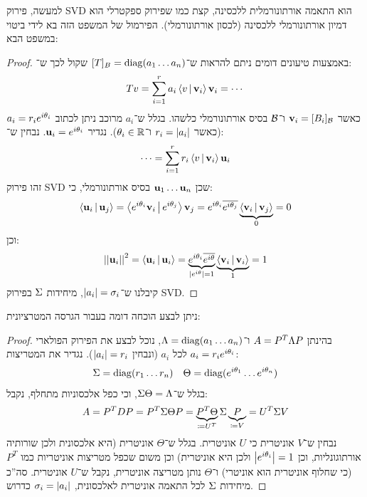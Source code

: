 \documentclass[name=רשימות אלגברה לינארית 2א]{../../../tex/classes/megasumPreamble}
\begin{document}
	
	למעשה, פירוק SVD הוא התאמה אורתונורמלית ללכסינה, קצת כמו שפירוק ספקטרלי הוא דמיון אורתונורמלי ללכסינה (לכסון אורתונורמלי). הפירמול של המשפט הזה בא לידי ביטוי במשפט הבא: 
	\begin{proof}
		באמצעות טיעונים דומים ניתם להראות ש־$[T]_B = \operatorname{diag}(a_1 \dots a_n)$ שקול לכך ש־:
		\[ Tv = \sum_{i = 1}^{r}a_i\left \langle v \,\middle|\, \bm{\mathrm{v}}_i \right \rangle\bm{\mathrm{v}}_i = \cdots \]
		כאשר $\bm{\mathrm{v}}_i = [B_i]_{\mathcal{B}}$ ו־$\mathcal{B}$ בסיס אורתונורמלי כלשהו. בגלל ש־$a_i$ מרוכב ניתן לכתוב $a_i = r_ie^{i\theta_i}$ (כאשר $r_i = \left \lvert a_i \right \rvert$ ו־$\theta_i \in \mathbb{R}$). נגדיר $\bm{\mathrm{u}}_i = e^{i\theta_i}$. נבחין ש־: 
		\[ \cdots = \sum_{i = 1}^{r}r_i\left \langle v \,\middle|\, \bm{\mathrm{v}}_i \right \rangle\bm{\mathrm{u}}_i \]
		זהו פירוק SVD שכן $\urm_1 \dots \urm_n$ בסיס אורתונורמלי, כי: 
		\[ \left \langle \bm{\mathrm{u}}_i \,\middle|\, \bm{\mathrm{u}}_j \right \rangle = \left \langle e^{i\theta_i}\bm{\mathrm{v}}_i \,\middle|\, e^{i\theta_j} \right \rangle\bm{\mathrm{v}}_j = e^{i\theta_i}\overline{e^{i \theta_j}}\underbrace{\left \langle \bm{\mathrm{v}}_i \,\middle|\, \bm{\mathrm{v}}_j \right \rangle}_{0} = 0 \]
		וכן: 
		\[ \left \vert \left \vert \bm{\mathrm{u}}_i \right \vert \right \vert^{2} = \left \langle \bm{\mathrm{u}}_i \,\middle|\, \bm{\mathrm{u}}_i \right \rangle = \underbrace{e^{i\theta_i}\overline{e^{i\theta}}}_{\left \lvert e^{i\theta} \right \rvert = 1}\underbrace{\left \langle \bm{\mathrm{v}}_i \,\middle|\, \bm{\mathrm{v}}_i \right \rangle}_{1} = 1 \]
		קיבלנו ש־$\left \lvert a_i \right \rvert = \sigma_i$, מיחידות $\Sigma$ בפירוק SVD. 
	\end{proof}
	
	ניתן לבצע הוכחה דומה בעבור הגרסה המטרציונית: 
	\begin{proof}
		בהינתן $A = P^T\Lambda P$ ו־$\Lambda = \operatorname{diag}(a_1 \dots a_n)$, נוכל לבצע את הפירוק הפולארי $a_i = r_ie^{i\theta_i}$ לכל $a_i$ (ונבחין $\left \lvert a_i \right \rvert = r_i$). נגדיר את המטריצות: 
		\begin{align*}
			\Sigma = \operatorname{diag}(r_1 \dots r_n) && \Theta = \operatorname{diag}(e^{i\theta_1} \dots e^{i\theta_n})
		\end{align*}
		בגלל ש־$\Sigma\Theta = \Lambda$, וכי כפל אלכסוניות מתחלף, נקבל: 
		\[ A = P^TDP = P^T\Sigma \Theta P = \underbrace{P^T\Theta}_{\coloneqq U^T} \Sigma \underbrace{P}_{\coloneqq V} = U^T\Sigma V  \]
		נבחין ש־$V$ אוניטרית כי $U$ אוניטרית. בגלל ש־$\Theta$ אוניטרית (היא אלכסונית ולכן שורותיה אורתוגונליות, וכן $\left \lvert e^{i\theta_i} \right \rvert = 1$ ולכן היא אוניטרית) וכן משום שכפל מטריצות אוניטריות כמו $P^T$ (כי שחלוף אוניטרית הוא אוניטרי) ו־$\Theta$ נותן מטריצה אוניטרית, נקבל ש־$U$ אוניטרית. סה''כ מיחידות $\Sigma$ לכל התאמה אוניטרית לאלכסונית, $\sigma_i = \left \lvert a_i \right \rvert$ כדרוש. 
	\end{proof}
	
\end{document}

